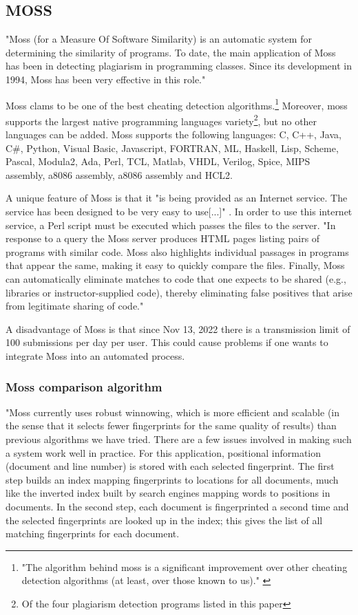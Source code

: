 \documentclass[a4paper, 11pt]{article}
\renewcommand{\\}{\vspace*{0.5\baselineskip} \newline}
\begin{document}
\newpage

\subsection{MOSS}

"Moss (for a Measure Of Software Similarity) is an automatic system for determining the similarity of programs. To date, the main application of Moss has been in detecting plagiarism in programming classes. Since its development in 1994, Moss has been very effective in this role." \autocite{SMOSS}

Moss clams to be one of the best cheating detection algorithms.\footnote{"The algorithm behind moss is a significant improvement over other cheating detection algorithms (at least, over those known to us)." \autocite{SMOSS}} Moreover, moss supports the largest native programming languages variety\footnote{Of the four plagiarism detection programs listed in this paper}, but no other languages can be added. Moss supports the following languages: C, C++, Java, C\#, Python, Visual Basic, Javascript, FORTRAN, ML, Haskell, Lisp, Scheme, Pascal, Modula2, Ada, Perl, TCL, Matlab, VHDL, Verilog, Spice, MIPS assembly, a8086 assembly, a8086 assembly and HCL2.

A unique feature of Moss is that it "is being provided as an Internet service. The service has been designed to be very easy to use[...]" \autocite{SMOSS}. In order to use this internet service, a Perl script must be executed which passes the files to the server. "In response to a query the Moss server produces HTML pages listing pairs of programs with similar code. Moss also highlights individual passages in programs that appear the same, making it easy to quickly compare the files. Finally, Moss can automatically eliminate matches to code that one expects to be shared (e.g., libraries or instructor-supplied code), thereby eliminating false positives that arise from legitimate sharing of code." \autocite{SMOSS}

A disadvantage of Moss is that since Nov 13, 2022 there is a transmission limit of 100 submissions per day per user. This could cause problems if one wants to integrate Moss into an automated process.

\subsubsection{Moss comparison algorithm}

"Moss currently uses robust winnowing, which is more efficient and scalable (in the sense that it selects fewer fingerprints for the same quality of results) than previous algorithms we have tried. There are a few issues involved in making such a system work well in practice. For this application, positional information (document and line number) is stored with each selected fingerprint. The first step builds an index mapping fingerprints to locations for all documents, much like the inverted index built by search engines mapping words to positions in documents. In the second step, each document is fingerprinted a second time and the selected fingerprints are looked up in the index; this gives the list of all matching fingerprints for each document.
\end{document}

